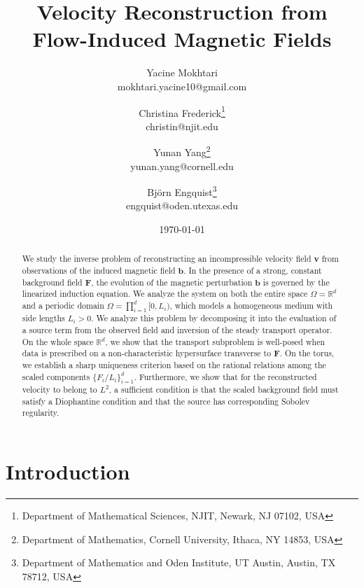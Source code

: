 \documentclass[12pt]{article}
\title{Velocity Reconstruction from Flow-Induced Magnetic Fields}
\author{
  Yacine Mokhtari \\ \small mokhtari.yacine10@gmail.com
  \and 
  Christina Frederick\thanks{Department of Mathematical Sciences, NJIT, Newark, NJ 07102, USA} \\ \small christin@njit.edu
  \and 
  Yunan Yang\thanks{Department of Mathematics, Cornell University, Ithaca, NY 14853, USA} \\ \small yunan.yang@cornell.edu
  \and 
  Bj\"orn Engquist\thanks{Department of Mathematics and Oden Institute, UT Austin, Austin, TX 78712, USA} \\ \small engquist@oden.utexas.edu
}
\date{\today}
\begin{document}
 \maketitle
\begin{abstract}



We study the inverse problem of reconstructing an incompressible velocity field $\boldsymbol{v}$ from observations of the induced magnetic field $\boldsymbol{b}$.
 In the presence of a strong, constant background field $\mathbf{F}$, the evolution of the magnetic perturbation $\boldsymbol{b}$ is governed by the linearized induction equation. We analyze the system on both the entire space $\Omega = \mathbb{R}^d$ and a periodic domain $\Omega = \prod_{i=1}^d [0, L_i)$, which models a homogeneous medium with side lengths $L_i > 0$. We analyze this problem by decomposing it into the evaluation of a source term from the observed field and inversion of the steady transport operator. On the whole space $\mathbb{R}^d$, we show that the transport subproblem is well-posed when data is prescribed on a non-characteristic hypersurface  transverse to $\mathbf{F}$. On the torus, we establish a sharp uniqueness criterion based on the rational relations among the scaled components $\{F_i/L_i\}_{i=1}^d$. Furthermore, we show that for the reconstructed velocity to belong to $L^2$, a sufficient condition is that the scaled background field must satisfy a Diophantine condition and that the source has corresponding Sobolev regularity.  %
\end{abstract}



	
	
	\section{Introduction}
	
\end{document}

